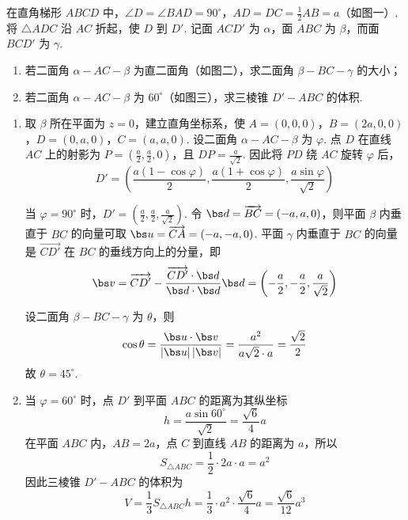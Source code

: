 \begin{problem}
在直角梯形 \(ABCD\) 中，\(\angle D=\angle BAD=90^\circ\)，\(AD=DC=\frac{1}{2}AB=a\)（如图一）. 将 \(\triangle ADC\) 沿 \(AC\) 折起，使 \(D\) 到 \(D'\). 记面 \(ACD'\) 为 \(\alpha\)，面 \(ABC\) 为 \(\beta\)，而面 \(BCD'\) 为 \(\gamma\).

\begin{enumerate}
\item 若二面角 \(\alpha-AC-\beta\) 为直二面角（如图二），求二面角 \(\beta-BC-\gamma\) 的大小；
\item 若二面角 \(\alpha-AC-\beta\) 为 \(60^\circ\)（如图三），求三棱锥 \(D'-ABC\) 的体积.
\end{enumerate}

\end{problem}

\begin{solution}
\begin{enumerate}
\item 取 \(\beta\) 所在平面为 \(z=0\)，建立直角坐标系，使
\(A=(0,0,0)\)，\(B=(2a,0,0)\)，\(D=(0,a,0)\)，\(C=(a,a,0)\).
设二面角 \(\alpha-AC-\beta\) 为 \(\varphi\). 点 \(D\) 在直线 \(AC\) 上的射影为 \(P=(\frac a2,\frac a2,0)\)，且 \(DP=\frac{a}{\sqrt2}\). 因此将 \(PD\) 绕 \(AC\) 旋转 \(\varphi\) 后，
\[
D'=\left(\frac{a(1-\cos\varphi)}2,\frac{a(1+\cos\varphi)}2,\frac{a\sin\varphi}{\sqrt2}\right)
\]

当 \(\varphi=90^{\circ}\) 时，\(D'=\left(\frac a2,\frac a2,\frac a{\sqrt2}\right)\). 令 \(\bs d=\overrightarrow{BC}=(-a,a,0)\)，则平面 \(\beta\) 内垂直于 \(BC\) 的向量可取 \(\bs u=\overrightarrow{CA}=(-a,-a,0)\). 平面 \(\gamma\) 内垂直于 \(BC\) 的向量是 \(\overrightarrow{CD'}\) 在 \(BC\) 的垂线方向上的分量，即
\[
\bs v=\overrightarrow{CD'}-\frac{\overrightarrow{CD'}\cdot\bs d}{\bs d\cdot\bs d}\bs d=\left(-\frac a2,-\frac a2,\frac a{\sqrt2}\right)
\]

设二面角 \(\beta-BC-\gamma\) 为 \(\theta\)，则
\[
\cos\theta=\frac{\bs u\cdot\bs v}{|\bs u|\,|\bs v|}=\frac{a^2}{a\sqrt2\cdot a}=\frac{\sqrt2}{2}
\]
故 \(\theta=45^{\circ}\).

\item 当 \(\varphi=60^{\circ}\) 时，点 \(D'\) 到平面 \(ABC\) 的距离为其纵坐标
\[
h=\frac{a\sin60^{\circ}}{\sqrt2}=\frac{\sqrt6}{4}a
\]
在平面 \(ABC\) 内，\(AB=2a\)，点 \(C\) 到直线 \(AB\) 的距离为 \(a\)，所以
\[
S_{\triangle ABC}=\frac12\cdot2a\cdot a=a^2
\]
因此三棱锥 \(D'-ABC\) 的体积为
\[
V=\frac13S_{\triangle ABC}h=\frac13\cdot a^2\cdot\frac{\sqrt6}{4}a=\frac{\sqrt6}{12}a^3
\]
\end{enumerate}
\end{solution}

